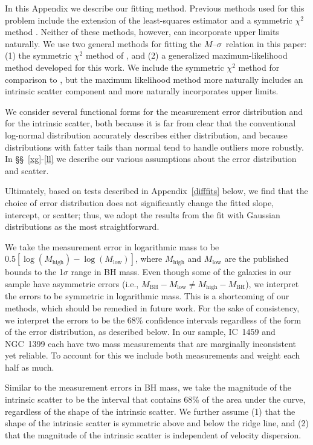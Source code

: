 \documentclass[twosided,letterpaper,numberedappendix]{emulateapj}
\newcommand{\msigma}   {\ensuremath{M}{--}\ensuremath{\sigma}}
\newcommand{\mbh}      {\ensuremath{M_{\mathrm{BH}}}}
\begin{document}
In this Appendix we describe our fitting method.  Previous methods
used for this problem include the \citet{ab96} extension of the 
least-squares estimator \citep{fm00} and a symmetric $\chi^2$ method
\citep{tremaineetal02}.  Neither of these methods, however, can
incorporate upper limits naturally. We use two general
methods for fitting the \msigma\ relation in this paper: (1) the
symmetric $\chi^2$ method of \citet{tremaineetal02}, and (2) a
generalized maximum-likelihood method developed for this work.  We
include the symmetric $\chi^2$ method for comparison to
\citet{tremaineetal02}, but the maximum likelihood method more
naturally includes an intrinsic scatter component and more naturally
incorporates upper limits.

We consider several functional forms for the measurement error
distribution and for the intrinsic scatter, both because it is far
from clear that the conventional log-normal distribution accurately
describes either distribution, and because distributions with fatter
tails than normal tend to handle outliers more robustly.  In
\S\S~\ref{xg}-\ref{ll} we describe our various assumptions about the
error distribution and scatter.

Ultimately, based on tests described in Appendix~\ref{difffits} below,
we find that the choice of error distribution does not significantly
change the fitted slope, intercept, or scatter; thus, we adopt
the results from the fit with Gaussian distributions as the most
straightforward.

We take the measurement error in logarithmic mass to be $0.5
[\log{(M_{\mathrm{high}})} - \log{(M_{\mathrm{low}})}]$, where
$M_\mathrm{high}$ and $M_\mathrm{low}$ are the published bounds to the
1$\sigma$ range in BH mass.  Even though some of the galaxies
in our sample have asymmetric errors (i.e., $\mbh - M_{\mathrm{low}}
\not= M_{\mathrm{high}} - \mbh$), we interpret the errors to be
symmetric in logarithmic mass.  This is a shortcoming of our methods,
which should be remedied in future work.  For the sake of consistency,
we interpret the errors to be the 68\% confidence intervals regardless
of the form of the error distribution, as described below.  In our
sample, IC~1459 and NGC~1399 each have two mass measurements that are
marginally inconsistent yet reliable.  To account for this we include
both measurements and weight each half as much.

Similar to the measurement errors in BH mass, we take the magnitude of
the intrinsic scatter to be the interval that contains 68\% of the
area under the curve, regardless of the shape of the intrinsic
scatter.  We further assume (1) that the shape of the intrinsic
scatter is symmetric above and below the ridge line, and (2) that the
magnitude of the intrinsic scatter is independent of velocity
dispersion.
\end{document}
